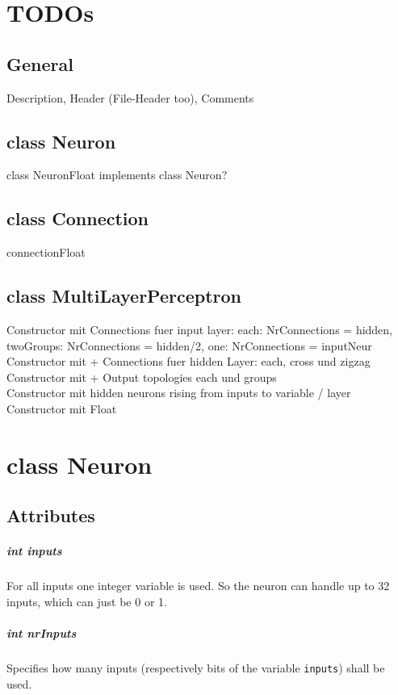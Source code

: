 \chapter{TODOs}
\section{General}
Description, Header (File-Header too), Comments

\section{class Neuron}
class NeuronFloat implements class Neuron?

\section{class Connection}
connectionFloat

\section{class MultiLayerPerceptron}
Constructor mit Connections fuer input layer: each: NrConnections = hidden, twoGroups: NrConnections = hidden/2, one: NrConnections = inputNeur\\
Constructor mit + Connections fuer hidden Layer: each, cross und zigzag\\
Constructor mit + Output topologies each und groups\\
Constructor mit hidden neurons rising from inputs to variable / layer\\
Constructor mit Float\\

\chapter{class Neuron}
\section{Attributes}
\paragraph{int inputs}
For all inputs one integer variable is used. So the neuron can handle up to 32 inputs, which can just be 0 or 1.

\paragraph{int nrInputs}
Specifies how many inputs (respectively bits of the variable \texttt{inputs}) shall be used.


